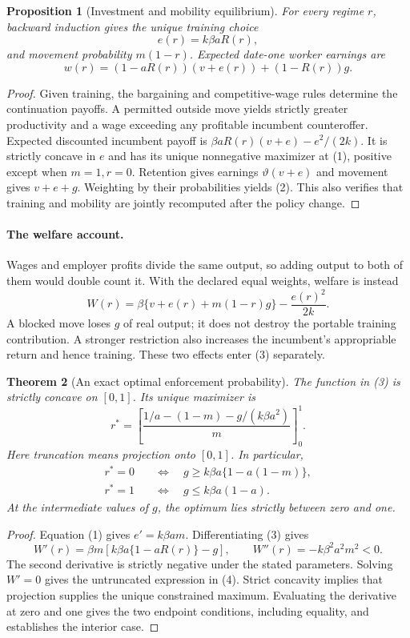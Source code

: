 \documentclass[11pt]{article}
\newtheorem{theorem}{Theorem}
\newtheorem{proposition}[theorem]{Proposition}
\theoremstyle{definition}
\begin{document}
\begin{proposition}[Investment and mobility equilibrium]
For every regime $r$, backward induction gives the unique training choice
\[
 e(r)=k\beta aR(r),
 \tag{1}
\]
and movement probability $m(1-r)$. Expected date-one worker earnings are
\[
 w(r)=(1-aR(r))(v+e(r))+(1-R(r))g.
 \tag{2}
\]
\end{proposition}
\begin{proof}
Given training, the bargaining and competitive-wage rules determine the continuation payoffs. A permitted outside move yields strictly greater productivity and a wage exceeding any profitable incumbent counteroffer. Expected discounted incumbent payoff is $\beta aR(r)(v+e)-e^2/(2k)$. It is strictly concave in $e$ and has its unique nonnegative maximizer at (1), positive except when $m=1,r=0$. Retention gives earnings $\vartheta(v+e)$ and movement gives $v+e+g$. Weighting by their probabilities yields (2). This also verifies that training and mobility are jointly recomputed after the policy change.
\end{proof}

\paragraph{The welfare account.}
Wages and employer profits divide the same output, so adding output to both of them would double count it. With the declared equal weights, welfare is instead
\[
 W(r)=\beta\{v+e(r)+m(1-r)g\}-\frac{e(r)^2}{2k}.
 \tag{3}
\]
A blocked move loses $g$ of real output; it does not destroy the portable training contribution. A stronger restriction also increases the incumbent's appropriable return and hence training. These two effects enter (3) separately.

\begin{theorem}[An exact optimal enforcement probability]
The function in (3) is strictly concave on $[0,1]$. Its unique maximizer is
\[
 r^*=\left[
 \frac{1/a-(1-m)-g/(k\beta a^2)}{m}
 \right]_0^1.
 \tag{4}
\]
Here truncation means projection onto $[0,1]$. In particular,
\[
 \begin{split}
 r^*=0&\quad\Longleftrightarrow\quad
 g\geq k\beta a\{1-a(1-m)\},\\
 r^*=1&\quad\Longleftrightarrow\quad
 g\leq k\beta a(1-a).
 \end{split}
\]
At the intermediate values of $g$, the optimum lies strictly between zero and one.
\end{theorem}
\begin{proof}
Equation (1) gives $e'=k\beta am$. Differentiating (3) gives
\[
 W'(r)=\beta m\left[k\beta a\{1-aR(r)\}-g\right],
 \qquad W''(r)=-k\beta^2a^2m^2<0.
\]
The second derivative is strictly negative under the stated parameters. Solving $W'=0$ gives the untruncated expression in (4). Strict concavity implies that projection supplies the unique constrained maximum. Evaluating the derivative at zero and one gives the two endpoint conditions, including equality, and establishes the interior case.
\end{proof}
\end{document}
